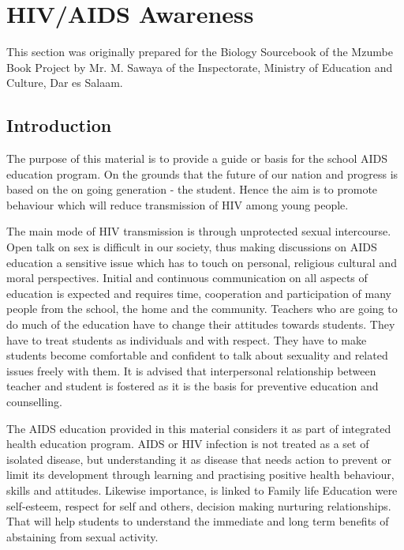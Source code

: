 \chapter{HIV/AIDS Awareness} 

This section was originally prepared for the Biology Sourcebook of the Mzumbe Book Project by Mr. M. Sawaya of the Inspectorate, Ministry of Education and Culture, Dar es Salaam.

\section{Introduction}

The purpose of this material is to provide a guide or basis for the school AIDS education
program. On the grounds that the future of our nation and progress is based on the on going
generation - the student. Hence the aim is to promote behaviour which will reduce
transmission of HIV among young people.

The main mode of HIV transmission is through unprotected sexual intercourse. Open talk on
sex is difficult in our society, thus making discussions on AIDS education a sensitive issue
which has to touch on personal, religious cultural and moral perspectives. Initial and
continuous communication on all aspects of education is expected and requires time,
cooperation and participation of many people from the school, the home and the community.
Teachers who are going to do much of the education have to change their attitudes towards
students. They have to treat students as individuals and with respect. They have to make
students become comfortable and confident to talk about sexuality and related issues freely
with them. It is advised that interpersonal relationship between teacher and student is
fostered as it is the basis for preventive education and counselling.

The AIDS education provided in this material considers it as part of integrated health
education program. AIDS or HIV infection is not treated as a set of isolated disease, but
understanding it as disease that needs action to prevent or limit its development through
learning and practising positive health behaviour, skills and attitudes. Likewise importance, is
linked to Family life Education were self-esteem, respect for self and others, decision making
nurturing relationships. That will help students to understand the immediate and long term
benefits of abstaining from sexual activity.

